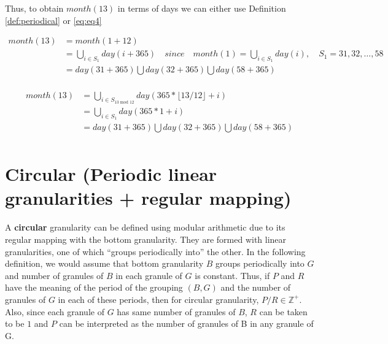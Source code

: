 \documentclass[10pt,a4paper,]{article}
\begin{document}
Thus, to obtain \(month(13)\) in terms of days we can either use Definition \autoref{def:periodical} or \autoref{eq:eq4}

\begin{equation}
\begin{split}
month(13) & =  month (1 + 12)\\
 & = \bigcup_{i \in S_1} day(i + 365) \quad since \quad month(1) =  \bigcup_{i \in S_1}day(i), \quad S_1 = {31, 32, \dots, 58}\\
 & = day(31 + 365)\bigcup day(32 + 365)\bigcup day(58 + 365)\\
\end{split}
\end{equation}

\begin{equation}
\begin{split}
month(13) & = \bigcup_{i \in S_{13 \text{~mod~}12}}day(365*\lfloor 13/12 \rfloor + i)\\
 & = \bigcup_{i \in S_1}day(365*1 + i)\\
 & = day(31 + 365)\bigcup day(32 + 365)\bigcup day(58 + 365)\\
\end{split}
\end{equation}

\hypertarget{circular-periodic-linear-granularities-regular-mapping}{%
\section{Circular (Periodic linear granularities + regular mapping)}\label{circular-periodic-linear-granularities-regular-mapping}}

A \textbf{circular} granularity can be defined using modular arithmetic due to its regular mapping with the bottom granularity. They are formed with linear granularities, one of which \enquote{groups periodically into} the other. In the following definition, we would assume that bottom granularity \(B\) groups periodically into \(G\) and number of granules of \(B\) in each granule of \(G\) is constant. Thus, if \(P\) and \(R\) have the meaning of the period of the grouping \((B, G)\) and the number of granules of \(G\) in each of these periods, then for circular granularity, \(P/R \in \mathbb{Z}^+\). Also, since each granule of \(G\) has same number of granules of \(B\), \(R\) can be taken to be \(1\) and \(P\) can be interpreted as the number of granules of B in any granule of G.
\end{document}
